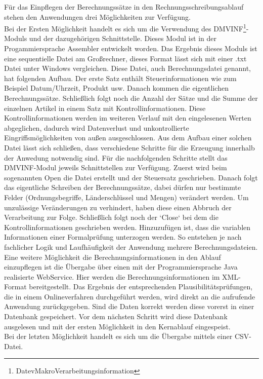 Für das Einpflegen der Berechnungssätze in den Rechnungsschreibungsablauf stehen den Anwendungen drei Möglichkeiten zur Verfügung. \\
Bei der Ersten Möglichkeit handelt es sich um die Verwendung des DMVINF\footnote{DatevMakroVerarbeitungsinformation}-Moduls und der dazugehörigen Schnittstelle.
Dieses Modul ist in der Progammiersprache Assembler entwickelt worden.
Das Ergebnis dieses Moduls ist eine sequentielle Datei am Großrechner, dieses Format lässt sich mit einer .txt Datei unter Windows vergleichen.
Diese Datei, auch Berechnungsdatei genannt, hat folgenden Aufbau.
Der erste Satz enthält Steuerinformationen wie zum Beispiel Datum/Uhrzeit, Produkt usw.
Danach kommen die eigentlichen Berechnungssätze.
Schließlich folgt noch die Anzahl der Sätze und die Summe der einzelnen Artikel in einem Satz mit Kontrollinformationen.
Diese Kontrollinformationen werden im weiteren Verlauf mit den eingelesenen Werten abgeglichen, dadurch wird Datenverlust und unkontrollierte Eingriffsmöglichkeiten von außen ausgeschlossen.
Aus dem Aufbau einer solchen Datei lässt sich schließen, dass verschiedene Schritte für die Erzeugung innerhalb der Anwedung notwendig sind.
Für die nachfolgenden Schritte stellt das DMVINF-Modul jeweils Schnittstellen zur Verfügung.
Zuerst wird beim sogenannten Open die Datei erstellt und der Steuersatz geschrieben.
Danach folgt das eigentliche Schreiben der Berechnungssätze, dabei dürfen nur bestimmte Felder (Ordnungsbegriffe, Länderschlüssel und Mengen) verändert werden.
Um unzulässige Veränderungen zu verhindert, haben diese einen Abbruch der Verarbeitung zur Folge.
Schließlich folgt noch der `Close` bei dem die Kontrollinformationen geschrieben werden.
Hinzuzufügen ist, dass die variablen Informationen einer Formalprüfung unterzogen werden.
So entstehen je nach fachlicher Logik und Laufhäufigkeit der Anwendung mehrere Berechnungsdateien. \\
Eine weitere Möglichkeit die Berechnungsinformationen in den Ablauf einzupflegen ist die Übergabe über einen mit der Programmiersprache Java realisierte WebService.
Hier werden die Berechnungsinformationen im XML-Format bereitgestellt.
Das Ergebnis der entsprechenden Plausibilitätsprüfungen, die in einem Onlineverfahren durchgeführt werden, wird direkt an die aufrufende Anwendung zurückgegeben.
Sind die Daten korrekt werden diese vorerst in einer Datenbank gespeichert.
Vor dem nächsten Schritt wird diese Datenbank ausgelesen und mit der ersten Möglichkeit in den Kernablauf eingespeist. \\
Bei der letzten Möglichkeit handelt es sich um die Übergabe mittels einer CSV-Datei.
